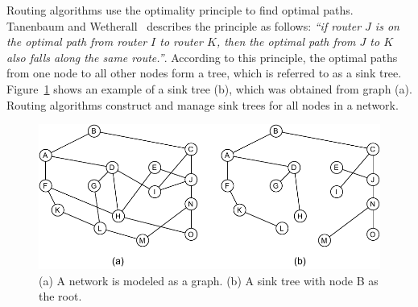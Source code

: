 \documentclass[english,version-2019-11]{uzl-thesis}
\begin{document}
Routing algorithms use the optimality principle
to find optimal paths. Tanenbaum and Wetherall~\cite{Tanenbaum} describes the
principle as follows: \emph{``if router $J$ is on the optimal path from router $I$ to router $K$, then the optimal path from $J$ to $K$ also falls along the same route.''}. According to this principle,
the optimal paths from one node to all other
nodes form a tree, which is referred to as a sink tree.
Figure~\ref{sinkTree} shows an example of a sink tree (b), which
was obtained from graph (a). Routing algorithms
construct and manage sink trees for all nodes in a network.~\cite{Tanenbaum}
\begin{figure}[htpb]
  \centering
  \includegraphics{sinkTree.pdf}
  \caption{(a) A network is modeled as a graph. (b) A sink tree with node B as the root.~\cite{Tanenbaum}}
  \label{sinkTree}
\end{figure}
\end{document}
